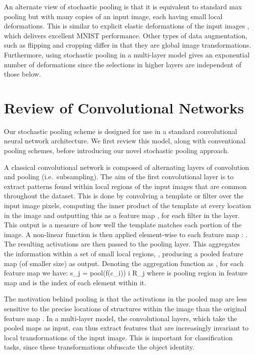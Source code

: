 \documentclass{article} \usepackage{nips12submit_e,times}
\def\BE{\vspace{-0.0mm}}
\begin{document}
An alternate view of stochastic pooling is that it is equivalent to
standard max pooling but with many copies of an input image, each
having small local deformations. This is similar to explicit elastic
deformations of the input images \cite{Simard03}, which delivers
excellent MNIST performance. Other types of data augmentation, such as
flipping and cropping differ in that they are global image
transformations. Furthermore, using stochastic pooling in a
multi-layer model gives an exponential number of deformations since
the selections in higher layers are independent of those below.



\section{Review of Convolutional Networks}

Our stochastic pooling scheme is designed for use in a standard
convolutional neural network architecture. We first review this model,
along with conventional pooling schemes, before introducing our novel
stochastic pooling approach.

A classical convolutional network is composed of alternating layers of
convolution and pooling (i.e.~subsampling).  The aim of the first
convolutional layer is to extract patterns found within local regions
of the input images that are common throughout the dataset.  This is
done by convolving a template or filter over the input image pixels,
computing the inner product of the template at every location in the
image and outputting this as a feature map , for each filter in the
layer. This output is a measure of how well the template matches each
portion of the image. A non-linear function  is then applied
element-wise to each feature map : . The resulting
activations  are then passed to the pooling layer. This aggregates
the information within a set of small local regions, , producing a
pooled feature map  (of smaller size) as output. Denoting the
aggregation function as , for each feature map  we have:
\BE s_j = pool(f(c_i)) \;\;\; \forall i \in R_j \EE where  is
pooling region  in feature map  and  is the index of each
element within it.

The motivation behind pooling is that the activations in the pooled map
 are less sensitive to the precise locations of structures within
the image than the original feature map . In a multi-layer model,
the convolutional layers, which take the pooled maps as input,
can thus extract features that are increasingly invariant to local
transformations of the input image. This is important for
classification tasks, since these transformations obfuscate the object
identity.
\end{document}
